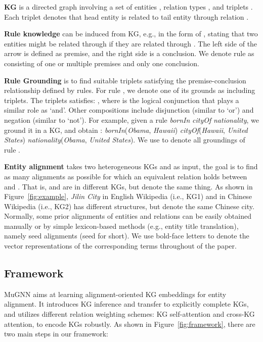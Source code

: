 \documentclass[11pt,a4paper]{article}
\newcommand{\para}[1]{\vspace{0.01in}\noindent\textbf{#1 }}
\begin{document}
\para{KG} is a directed graph  involving a set of entities , relation types , and triplets . Each triplet  denotes that head entity  is related to tail entity  through relation .

\para{Rule knowledge}  can be induced from KG, e.g., in the form of , stating that two entities might be related through  if they are related through . The left side of the arrow is defined as premise, and the right side is a conclusion. We denote rule as  consisting of one or multiple  premises and only one conclusion.

\para{Rule Grounding} is to find suitable triplets satisfying the premise-conclusion relationship defined by rules. For rule , we denote one of its grounds as  including  triplets. The triplets satisfies: , where  is the logical conjunction that plays a similar role as `and'. Other compositions include disjunction  (similar to `or') and negation  (similar to `not'). For example, given a rule \textit{bornIn}  \textit{cityOf}  \textit{nationality}, we ground it in a KG, and obtain : \textit{bornIn}(\textit{Obama}, \textit{Hawaii})  \textit{cityOf}(\textit{Hawaii}, \textit{United States})  \textit{nationality}(\textit{Obama}, \textit{United States}). We use  to denote all groundings of rule .

\para{Entity alignment} takes two heterogeneous KGs  and  as input, the goal is to find as many alignments as possible  for which an equivalent relation  holds between  and . That is,  and  are in different KGs, but denote the same thing. As shown in Figure~\ref{fig:example}, \textit{Jilin City} in English Wikipedia (i.e., KG1) and in Chinese Wikipedia (i.e., KG2) has different structures, but denote the same Chinese city. Normally, some prior alignments of entities  and relations  can be easily obtained manually or by simple lexicon-based methods (e.g., entity title translation), namely seed alignments (seed for short). We use bold-face letters to denote the vector representations of the corresponding terms throughout of the paper.

\subsection{Framework}
MuGNN aims at learning alignment-oriented KG embeddings for entity alignment. It introduces KG inference and transfer to explicitly complete KGs, and utilizes different relation weighting schemes: KG self-attention and cross-KG attention, to encode KGs robustly. As shown in Figure~\ref{fig:framework}, there are two main steps in our framework:
\end{document}
